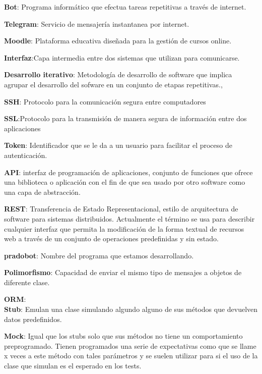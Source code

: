\documentclass[a4paper,11pt]{book}
\begin{document}
\textbf{Bot}: Programa informático que efectua tareas repetitivas a través de internet\cite{wikibot}\cite{wikibot2}.\par
\textbf{Telegram}: Servicio de mensajería instantanea por internet.\par
\textbf{Moodle}: Plataforma educativa diseñada para la gestión de cursos online.\par
\textbf{Interfaz}:Capa intermedia entre dos sistemas que utilizan para comunicarse.\par
\textbf{Desarrollo iterativo}: Metodología de desarrollo de software que implica agrupar el desarrollo del sofware en un conjunto de etapas repetitivas.\cite{wikiiterativo}, \cite{wikiiterativo2} \par
\textbf{SSH}: Protocolo para la comunicación segura entre computadores\cite{ssh}\par
\textbf{SSL}:Protocolo para la transmisión de manera segura de información entre dos aplicaciones\par
\textbf{Token}: Identificador que se le da a un usuario para facilitar el proceso de autenticación.\par
\textbf{API}:  interfaz de programación de aplicaciones, conjunto de funciones que ofrece una biblioteca o aplicación con el fin de que sea usado por otro software como una capa de abstracción.\par
\textbf{REST}:  Transferencia de Estado Representacional, estilo de arquitectura de software para sistemas distribuidos. Actualmente el término se usa para describir cualquier interfaz  que permita la modificación de la forma textual de recursos web a través de un conjunto de operaciones predefinidas y sin estado.\par\cite{rest}\cite{rest2}
\textbf{pradobot}:  Nombre del programa que estamos desarrollando.\par
\textbf{Polimorfismo}: Capacidad de enviar el mismo tipo de mensajes a objetos de diferente clase. \par
\textbf{ORM}:  
\\
\textbf{Stub}: Emulan\cite{CC} una clase simulando algundo alguno de sus métodos que devuelven datos predefinidos.\par
\textbf{Mock}: Igual que los stubs solo que sus métodos no tiene un comportamiento preprogramado. Tienen programados una serie de expectativas como que se llame x veces a este método con tales parámetros y se suelen utilizar para si el uso de la clase que simulan es el esperado en los tests.\par
\end{document}
